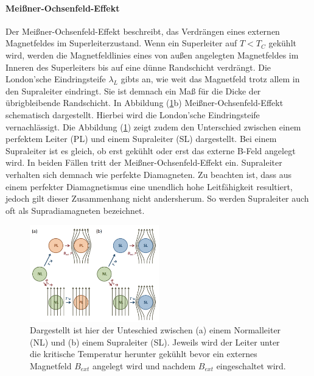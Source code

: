 \paragraph{Mei{\ss}ner-Ochsenfeld-Effekt}
Der Mei{\ss}ner-Ochsenfeld-Effekt beschreibt, das Verdr\"{a}ngen eines externen Magnetfeldes im Superleiterzustand.
Wenn ein Superleiter auf $T < T_C$ gek\"{u}hlt wird, werden die Magnetfeldlinies eines von au{\ss}en angelegten Magnetfeldes im Inneren des Superleiters bis auf eine d\"{u}nne Randschicht verdr\"{a}ngt.
Die London'sche Eindringsteife $\lambda_L$ gibts an, wie weit das Magnetfeld trotz allem in den Supraleiter eindringt.
Sie ist demnach ein Ma{\ss} f\"{u}r die Dicke der \"{u}brigbleibende Randschicht.
In Abbildung (\ref{abb:MOEffekt}b) Mei{\ss}ner-Ochsenfeld-Effekt schematisch dargestellt.
Hierbei wird die London'sche Eindringsteife vernachl\"{a}ssigt.
Die Abbildung (\ref{abb:MOEffekt}) zeigt zudem den Unterschied zwischen einem perfektem Leiter (PL) und einem Supraleiter (SL) dargestellt.
Bei einem Supraleiter ist es gleich, ob erst gek\"{u}hlt oder erst das externe B-Feld angelegt wird.
In beiden F\"{a}llen tritt der Mei{\ss}ner-Ochsenfeld-Effekt ein.
Supraleiter verhalten sich demnach wie perfekte Diamagneten.
Zu beachten ist, dass aus einem perfekter Diamagnetismus eine unendlich hohe Leitf\"{a}higkeit resultiert, jedoch gilt dieser Zusammenhang nicht andersherum.
So werden Supraleiter auch oft als Supradiamagneten bezeichnet.
\begin{figure}
	\centering
	\includegraphics[width=0.5\textwidth]{Plots/MO_Effekt.png}
	\caption{Dargestellt ist hier der Unteschied zwischen (a) einem Normalleiter (NL) und (b) einem Supraleiter (SL). Jeweils wird der Leiter unter die kritische Temperatur herunter gek\"{u}hlt bevor ein externes Magnetfeld $B_{ext}$ angelegt wird und nachdem $B_{ext}$ eingeschaltet wird.}
	\label{abb:MOEffekt}
\end{figure}


